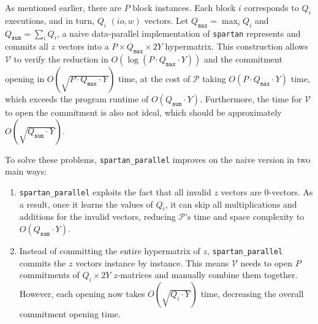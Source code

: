 \documentclass{article}
\newcommand{\code}{\texttt}
\newcommand{\Qsum}{Q_{\mathtt{sum}}}
\newcommand{\Qmax}{Q_{\mathtt{max}}}
\renewcommand{\P}{\mathcal{P}}
\newcommand{\V}{\mathcal{V}}
\begin{document}
As mentioned earlier, there are $P$ block instances. Each block $i$ corresponds to $Q_i$ executions, and in turn, $Q_i$ $(io, w)$ vectors. Let $\Qmax = \max_i Q_i$ and $\Qsum = \sum_i Q_i$, a naive data-parallel implementation of \code{spartan} represents and commits all $z$ vectors into a $P\times \Qmax\times 2Y$ hypermatrix. This construction allows $\V$ to verify the reduction in $O(\log (P\cdot \Qmax\cdot Y))$ and the commitment opening in $O(\sqrt{P\cdot \Qmax\cdot Y})$ time, at the cost of $\P$ taking $O(P\cdot \Qmax\cdot Y)$ time, which exceeds the program runtime of $O(\Qsum\cdot Y)$. Furthermore, the time for $\V$ to open the commitment is also not ideal, which should be approximately $O(\sqrt{\Qsum\cdot Y})$.

To solve these problems, \code{spartan\_parallel} improves on the naive version in two main ways:
\begin{enumerate}
    \item \code{spartan\_parallel} exploits the fact that all invalid $z$ vectors are 0-vectors. As a result, once it learns the values of $Q_i$, it can skip all multiplications and additions for the invalid vectors, reducing $\P$'s time and space complexity to $O(\Qsum\cdot Y)$.
    \item Instead of committing the entire hypermatrix of $z$, \code{spartan\_parallel} commits the $z$ vectors instance by instance. This means $\V$ needs to open $P$ commitments of $Q_i\times 2Y$ $z$-matrices and manually combine them together. However, each opening now takes $O(\sqrt{Q_i\cdot Y})$ time, decreasing the overall commitment opening time.
\end{enumerate}
\end{document}
